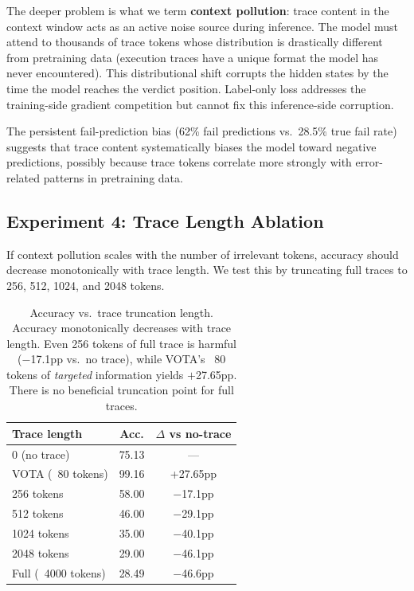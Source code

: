 \documentclass[11pt,a4paper]{article}
\begin{document}
The deeper problem is what we term \textbf{context pollution}: trace content in the context window acts as an active noise source during inference. The model must attend to thousands of trace tokens whose distribution is drastically different from pretraining data (execution traces have a unique format the model has never encountered). This distributional shift corrupts the hidden states by the time the model reaches the verdict position. Label-only loss addresses the training-side gradient competition but cannot fix this inference-side corruption.

The persistent fail-prediction bias (62\% fail predictions vs.\ 28.5\% true fail rate) suggests that trace content systematically biases the model toward negative predictions, possibly because trace tokens correlate more strongly with error-related patterns in pretraining data.

\subsection{Experiment 4: Trace Length Ablation}
\label{sec:exp4}

If context pollution scales with the number of irrelevant tokens, accuracy should decrease monotonically with trace length. We test this by truncating full traces to 256, 512, 1024, and 2048 tokens.

\begin{table}[t]
\centering
\small
\begin{tabular}{lcc}
\toprule
\textbf{Trace length} & \textbf{Acc.} & \textbf{$\Delta$ vs no-trace} \\
\midrule
0 (no trace) & 75.13 & --- \\
VOTA (~80 tokens) & 99.16 & +27.65pp \\
\midrule
256 tokens & 58.00 & $-$17.1pp \\
512 tokens & 46.00 & $-$29.1pp \\
1024 tokens & 35.00 & $-$40.1pp \\
2048 tokens & 29.00 & $-$46.1pp \\
Full (~4000 tokens) & 28.49 & $-$46.6pp \\
\bottomrule
\end{tabular}
\caption{Accuracy vs.\ trace truncation length. Accuracy monotonically decreases with trace length. Even 256 tokens of full trace is harmful ($-$17.1pp vs.\ no trace), while VOTA's ~80 tokens of \emph{targeted} information yields $+$27.65pp. There is no beneficial truncation point for full traces.}
\label{tab:length_ablation}
\end{table}
\end{document}
